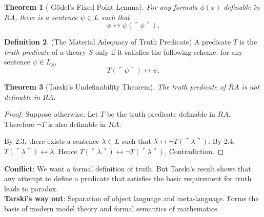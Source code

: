 \documentclass[12pt]{article}
\newtheorem{theo}{Theorem}[section]
\theoremstyle{definition}
\newtheorem{defin}[theo]{Definition}
\begin{document}
\begin{theo} [ G\"odel's Fixed Point Lemma]
For any formula $\phi(x)$ definable in $RA$, there is a sentence $\psi \in L$ such that
$$\phi \leftrightarrow \psi (\ulcorner \phi \urcorner).$$
\end{theo}

\begin{defin} (The Material Adequacy of Truth Predicate) 
A predicate $T$ is the \textit{truth predicate} of a theory $S$ only if it satisfies the following scheme: for any sentence $\psi \in L_S$,
$$T(\ulcorner \psi \urcorner) \leftrightarrow \psi.$$
\end{defin}

\begin{theo} [Tarski's Undefinability Theorem] 
The truth predicate of $RA$ is not definable in $RA$.
\end{theo}

\begin{proof}
Suppose otherwise. Let $T$ be the truth predicate definable in $RA$. Therefore $\neg T$ is also definable in $RA$.

By 2.3, there exists a sentence $\lambda \in L$ such that $\lambda \leftrightarrow \neg T (\ulcorner \lambda \urcorner)$. By 2.4, $ T(\ulcorner \lambda \urcorner) \leftrightarrow \lambda$. Hence $ T(\ulcorner \lambda \urcorner) \leftrightarrow \neg T (\ulcorner \lambda \urcorner)$. Contradiction.
\end{proof}

\noindent \textbf{Conflict}: We want a formal definition of truth. But Tarski's result shows that any attempt to define a predicate that satisfies the basic requirement for truth leads to paradox.\\

\noindent \textbf{Tarski's way out}: Separation of object language and meta-language. Forms the basis of modern model theory and formal semantics of mathematics.
\end{document}
